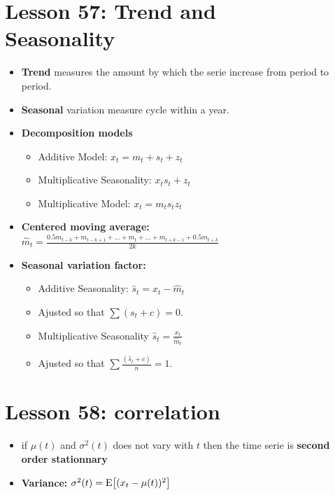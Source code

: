 \documentclass[10pt, french]{article}
\begin{document}
\begin{multicols*}{3}
\section*{Lesson 57: Trend and \\Seasonality}
\begin{itemize}[align=left,leftmargin=*]
  \item \textbf{Trend} measures the amount by which the serie increase from period to period.
  \item \textbf{Seasonal} variation measure cycle within a year.  
  \item \textbf{Decomposition models}
  \begin{itemize}
     \item  Additive Model: $x_t = m_t + s_t + z_t$
     \item Multiplicative Seasonality: $x_t s_t + z_t$
     \item Multiplicative Model: $x_t = m_t s_t z_t$
  \end{itemize}
  \item \textbf{Centered moving average:} \\
  $\hat{m}_t = \frac{0.5m_{t-k} + m_{t-k+1} + ... + m_t + ... + m_{t+k-1} + 0.5m_{t+k}}{2k}$
  \item \textbf{Seasonal variation factor:}  
  \begin{itemize}
     \item Additive Seasonality: $\hat{s}_t = x_t - \hat{m}_t$
     \item[] Ajusted so that $\sum (s_t + c) = 0$.
     \item  Multiplicative Seasonality $\hat{s}_t = \frac{x_t}{\hat{m}_t}$
     \item[] Ajusted so that $\sum \frac{(\hat{s}_t + c)}{n}= 1$.
  \end{itemize}
\end{itemize}

\section*{Lesson 58: correlation}
\begin{itemize}[align=left,leftmargin=*]
    \item if $\mu(t) $ and $\sigma^2(t)$ does not vary with $t$ then the time serie is \textbf{second order stationnary}
   \item \textbf{Variance:} $\sigma^2(t) = \mathrm{E} {\left[ (x_t -       \mu(t))^2 \right]}$
\end{itemize}

\end{multicols*}
\end{document}
